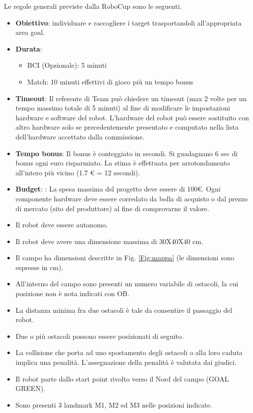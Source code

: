\documentclass[a4paper,12pt,italian]{article}
\begin{document}
Le regole generali previste dalla RoboCup sono le seguenti.
\begin{itemize}
	\item \textbf{Obiettivo}: individuare e raccogliere i target trasportandoli all'appropriata area goal.
	\item \textbf{Durata}: 
		\begin{itemize}
			\item BCI (Opzionale): 5 minuti
			\item Match: 10 minuti effettivi di gioco più un tempo bonus
		\end{itemize}
	\item \textbf{Timeout}: Il referente di Team può chiedere un timeout (max 2 volte per un tempo massimo totale di 5 minuti) al fine di modificare le impostazioni hardware e software del robot. L’hardware del robot può essere sostituito con altro hardware solo se precedentemente presentato e computato nella lista dell’hardware accettato dalla commissione.
	\item \textbf{Tempo bonus}: Il bonus è conteggiato in secondi. Si guadagnano 6 sec di bonus ogni euro risparmiato. La stima è effettuata per arrotondamento all’intero più vicino (1.7 \euro{} = 12 secondi).
	\item \textbf{Budget}: : La spesa massima del progetto deve essere di 100\euro{}. Ogni componente hardware deve essere corredato da bolla di acquisto o dal prezzo di mercato (sito del produttore) al fine di comprovarne il valore.
	\item Il robot deve essere autonomo.
	\item Il robot deve avere una dimensione massima di 30X40X40 cm.
	\item Il campo ha dimensioni descritte in Fig. \ref{Fig:mappa} (le dimensioni sono espresse in cm).
	\item All’interno del campo sono presenti un numero variabile di ostacoli, la cui posizione non è nota indicati con OB.
	\item La distanza minima fra due ostacoli è tale da consentire il passaggio del robot.
	\item Due o più ostacoli possono essere posizionati di seguito.
	\item La collisione che porta ad uno spostamento degli ostacoli o alla loro caduta implica una penalità. L’assegnazione della penalità è valutata dai giudici.
	\item Il robot parte dallo start point rivolto verso il Nord del campo (GOAL GREEN).
	\item Sono presenti 3 landmark M1, M2 ed M3 nelle posizioni indicate.

\end{itemize}
\end{document}

